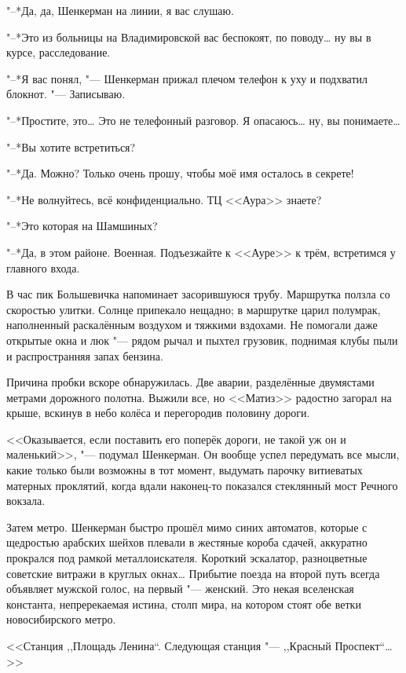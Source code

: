 "--*Да, да, Шенкерман на линии, я вас слушаю.

"--*Это из больницы на Владимировской вас беспокоят, по поводу\ldots{} ну вы в курсе, расследование.

"--*Я вас понял, "--- Шенкерман прижал плечом телефон к уху и подхватил блокнот.
"--- Записываю.

"--*Простите, это\ldots{}
Это не телефонный разговор.
Я опасаюсь\ldots{} ну, вы понимаете\ldots{}

"--*Вы хотите встретиться?

"--*Да.
Можно?
Только очень прошу, чтобы моё имя осталось в секрете!

"--*Не волнуйтесь, всё конфиденциально.
ТЦ <<Аура>> знаете?

"--*Это которая на Шамшиных?

"--*Да, в этом районе.
Военная.
Подъезжайте к <<Ауре>> к трём, встретимся у главного входа.

\asterism

В час пик Большевичка напоминает засорившуюся трубу.
Маршрутка ползла со скоростью улитки.
Солнце припекало нещадно;
в маршрутке царил полумрак, наполненный раскалённым воздухом и тяжкими вздохами.
Не помогали даже открытые окна и люк "--- рядом рычал и пыхтел грузовик, поднимая клубы пыли и распространняя запах бензина.

Причина пробки вскоре обнаружилась.
Две аварии, разделённые двумястами метрами дорожного полотна.
Выжили все, но <<Матиз>> радостно загорал на крыше, вскинув в небо колёса и перегородив половину дороги.

<<Оказывается, если поставить его поперёк дороги, не такой уж он и маленький>>, "--- подумал Шенкерман.
Он вообще успел передумать все мысли, какие только были возможны в тот момент, выдумать парочку витиеватых матерных проклятий, когда вдали наконец-то показался стеклянный мост Речного вокзала.

Затем метро.
Шенкерман быстро прошёл мимо синих автоматов, которые с щедростью арабских шейхов плевали в жестяные короба сдачей, аккуратно прокрался под рамкой металлоискателя.
Короткий эскалатор, разноцветные советские витражи в круглых окнах\ldots{}
Прибытие поезда на второй путь всегда объявляет мужской голос, на первый "--- женский.
Это некая вселенская константа, непререкаемая истина, столп мира, на котором стоят обе ветки новосибирского метро.

<<Станция ,,Площадь Ленина``. Следующая станция "--- ,,Красный Проспект``\ldots{}>>

